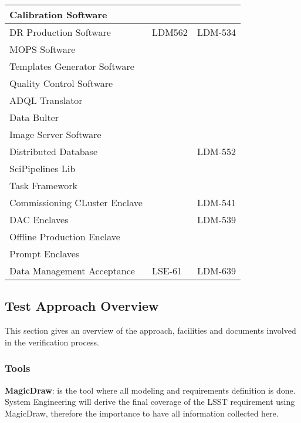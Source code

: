 {\begin{longtable}[]{p{8cm}|p{2cm}|p{2cm}}
Calibration Software & & \\\hline
DR Production Software &\cellcolor{ballblue} LDM562 & \cellcolor{ballblue} LDM-534 \\\hline
MOPS Software & & \\\hline
Templates Generator Software & & \\\hline
Quality Control Software & & \\\hline
ADQL Translator & & \\\hline
Data Bulter & & \\\hline
Image Server Software & & \\\hline
Distributed Database & & \cellcolor{ballblue} LDM-552 \\\hline
SciPipelines Lib & & \\\hline
Task Framework & & \\\hline
Commissioning CLuster Enclave & & \cellcolor{pastelyellow} LDM-541 \\\hline
DAC Enclaves & & \cellcolor{pastelyellow} LDM-539 \\\hline
Offline Production Enclave & & \\\hline
Prompt Enclaves & & \\\hline
Data Management Acceptance & \cellcolor{ballblue} LSE-61 & \cellcolor{pastelorange} LDM-639 \\\hline
\end{longtable}
}

\subsection{Test Approach Overview}\label{sect:tsform}

This section gives an overview of the approach, facilities and documents involved in the verification process.

\subsubsection{Tools}

{\bf MagicDraw}: is the tool where all modeling and requirements definition is done. System Engineering will derive the final coverage of the LSST requirement using MagicDraw, therefore the importance to have all information collected here.


